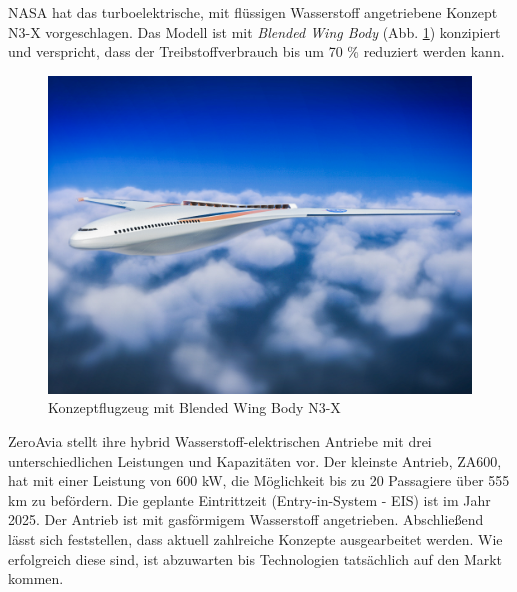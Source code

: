 NASA hat das turboelektrische, mit flüssigen Wasserstoff angetriebene 
Konzept N3-X \cite{NASA_N3X_2025} vorgeschlagen.
Das Modell ist mit \textit{Blended Wing Body} (Abb. \ref{NASA_konfig}) konzipiert und verspricht, 
dass der Treibstoffverbrauch bis um 70 \% reduziert werden kann.
\begin{figure}[h]
	\centering
	\includegraphics[width=0.6\linewidth]{Bilder/NASA.jpg}
	\caption[NASA]{Konzeptflugzeug mit Blended Wing Body N3-X \cite{NASA_N3X_2025} }
	\label{NASA_konfig}
\end{figure}

ZeroAvia stellt ihre hybrid Wasserstoff-elektrischen Antriebe 
mit drei unterschiedlichen Leistungen und Kapazitäten vor. 
Der kleinste Antrieb, ZA600, hat mit einer Leistung von 600 kW, 
die Möglichkeit bis zu 20 Passagiere über 555 km zu befördern. 
Die geplante Eintrittzeit (Entry-in-System - EIS) ist im Jahr 2025. 
Der Antrieb ist mit gasförmigem Wasserstoff angetrieben.
%
Abschließend lässt sich feststellen, dass aktuell zahlreiche Konzepte ausgearbeitet werden. 
Wie erfolgreich diese sind, ist abzuwarten bis Technologien tatsächlich auf den Markt kommen.
